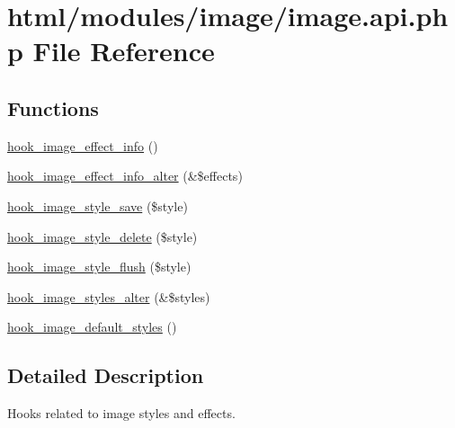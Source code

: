 \hypertarget{image_8api_8php}{
\section{html/modules/image/image.api.php File Reference}
\label{image_8api_8php}
}
\subsection*{Functions}
\begin{DoxyCompactItemize}
\item 
\hyperlink{group__hooks_ga9681816aeb01a316e98457b40a01f8ed}{hook\_\-image\_\-effect\_\-info} ()
\item 
\hyperlink{group__hooks_gaf48ed66489194afdf3e5bce6b3e28768}{hook\_\-image\_\-effect\_\-info\_\-alter} (\&\$effects)
\item 
\hyperlink{group__hooks_gad403dde0a7859e160772ae696ab35cea}{hook\_\-image\_\-style\_\-save} (\$style)
\item 
\hyperlink{group__hooks_ga376a3d4a9427d6a8dad73d68bdd140dc}{hook\_\-image\_\-style\_\-delete} (\$style)
\item 
\hyperlink{group__hooks_gac3c4d53e1323d4e140625e214d3a5f02}{hook\_\-image\_\-style\_\-flush} (\$style)
\item 
\hyperlink{group__hooks_gaf5549b8e546e9484c0de3093b49fea7d}{hook\_\-image\_\-styles\_\-alter} (\&\$styles)
\item 
\hyperlink{group__hooks_ga856096251574b0df42813f6aff0d62ab}{hook\_\-image\_\-default\_\-styles} ()
\end{DoxyCompactItemize}


\subsection{Detailed Description}
Hooks related to image styles and effects. 